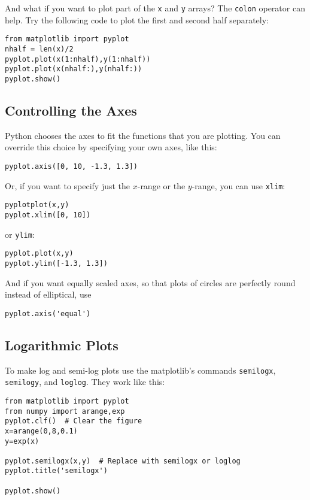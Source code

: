  And what if you want to plot part
of the \texttt{x} and \texttt{y} arrays? The {\tt colon} operator can
help.  Try the following code to plot the first and second half
separately:
\begin{Verbatim}
from matplotlib import pyplot
nhalf = len(x)/2
pyplot.plot(x(1:nhalf),y(1:nhalf))
pyplot.plot(x(nhalf:),y(nhalf:))
pyplot.show()
\end{Verbatim}

\subsection*{Controlling the Axes}
\label{sec:Axes}
 Python chooses the axes to fit the functions
that you are plotting. You can override this choice by specifying
your own axes, like this:
\begin{Verbatim}
pyplot.axis([0, 10, -1.3, 1.3])
\end{Verbatim}
  Or, if you want to specify just the
$x$-range or the $y$-range, you can use {\tt xlim}:
\begin{Verbatim}
pyplotplot(x,y)
pyplot.xlim([0, 10])
\end{Verbatim}
or {\tt ylim}:
\begin{Verbatim}
pyplot.plot(x,y)
pyplot.ylim([-1.3, 1.3])
\end{Verbatim}
And if you want equally scaled axes, so that plots of circles are
perfectly round instead of elliptical, use
\begin{Verbatim}
pyplot.axis('equal')
\end{Verbatim}
 


\subsection*{Logarithmic Plots}
  To make log and
semi-log plots use the matplotlib's commands {\tt semilogx}, {\tt semilogy}, and
{\tt loglog}. They work like this:
\begin{Verbatim}
from matplotlib import pyplot
from numpy import arange,exp
pyplot.clf()  # Clear the figure
x=arange(0,8,0.1)
y=exp(x)

pyplot.semilogx(x,y)  # Replace with semilogx or loglog
pyplot.title('semilogx')

pyplot.show()
\end{Verbatim}

